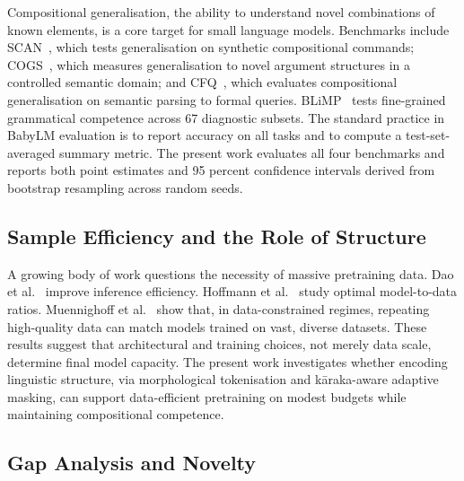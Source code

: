 Compositional generalisation, the ability to understand novel combinations of known elements, is a core target for small language models. Benchmarks include SCAN~\cite{Lake2018SCAN}, which tests generalisation on synthetic compositional commands; COGS~\cite{Kim2020COGS}, which measures generalisation to novel argument structures in a controlled semantic domain; and CFQ~\cite{Keysers2020CFQ}, which evaluates compositional generalisation on semantic parsing to formal queries. BLiMP~\cite{Warstadt2020BLiMP} tests fine-grained grammatical competence across 67 diagnostic subsets. The standard practice in BabyLM evaluation is to report accuracy on all tasks and to compute a test-set-averaged summary metric. The present work evaluates all four benchmarks and reports both point estimates and 95 percent confidence intervals derived from bootstrap resampling across random seeds.

\subsection{Sample Efficiency and the Role of Structure}

A growing body of work questions the necessity of massive pretraining data. Dao et al.~\cite{Dao2023FlashAttention} improve inference efficiency. Hoffmann et al.~\cite{Hoffmann2022Chinchilla} study optimal model-to-data ratios. Muennighoff et al.~\cite{Muennighoff2023Scaling} show that, in data-constrained regimes, repeating high-quality data can match models trained on vast, diverse datasets. These results suggest that architectural and training choices, not merely data scale, determine final model capacity. The present work investigates whether encoding linguistic structure, via morphological tokenisation and kāraka-aware adaptive masking, can support data-efficient pretraining on modest budgets while maintaining compositional competence.

\subsection{Gap Analysis and Novelty}

